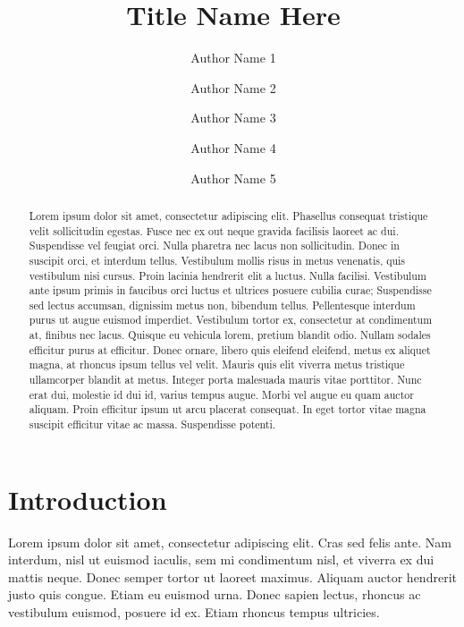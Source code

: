 \documentclass[linenumbers,RNAAS,trackchanges]{aastex631}
\begin{document}
\title{Title Name Here}
\author[0000-0000-0000-0000]{Author Name 1}

\author[0000-0000-0000-0000]{Author Name 2}


\author[0000-0000-0000-0000]{Author Name 3}
\author[0000-0000-0000-0000]{Author Name 4}
\author[0000-0000-0000-0000]{Author Name 5}

\begin{abstract}
Lorem ipsum dolor sit amet, consectetur adipiscing elit. Phasellus consequat tristique velit sollicitudin egestas. Fusce nec ex out neque gravida facilisis laoreet ac dui. Suspendisse vel feugiat orci. Nulla pharetra nec lacus non sollicitudin. Donec in suscipit orci, et interdum tellus. Vestibulum mollis risus in metus venenatis, quis vestibulum nisi cursus. Proin lacinia hendrerit elit a luctus. Nulla facilisi. Vestibulum ante ipsum primis in faucibus orci luctus et ultrices posuere cubilia curae; Suspendisse sed lectus accumsan, dignissim metus non, bibendum tellus.
Pellentesque interdum purus ut augue euismod imperdiet. Vestibulum tortor ex, consectetur at condimentum at, finibus nec lacus. Quisque eu vehicula lorem, pretium blandit odio. Nullam sodales efficitur purus at efficitur. Donec ornare, libero quis eleifend eleifend, metus ex aliquet magna, at rhoncus ipsum tellus vel velit. Mauris quis elit viverra metus tristique ullamcorper blandit at metus. Integer porta malesuada mauris vitae porttitor. Nunc erat dui, molestie id dui id, varius tempus augue. Morbi vel augue eu quam auctor aliquam. Proin efficitur ipsum ut arcu placerat consequat. In eget tortor vitae magna suscipit efficitur vitae ac massa. Suspendisse potenti.
\end{abstract}

\section{Introduction} \label{sec:intro}
Lorem ipsum dolor sit amet, consectetur adipiscing elit. Cras sed felis ante. Nam interdum, nisl ut euismod iaculis, sem mi condimentum nisl, et viverra ex dui mattis neque. Donec semper tortor ut laoreet maximus. Aliquam auctor hendrerit justo quis congue. Etiam eu euismod urna. Donec sapien lectus, rhoncus ac vestibulum euismod, posuere id ex. Etiam rhoncus tempus ultricies.
\end{document}
